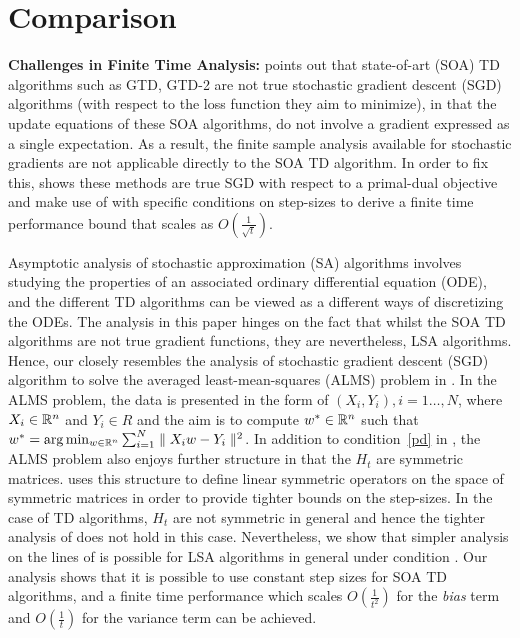 \section{Comparison}
\textbf{Challenges in Finite Time Analysis:} \cite{} points out that state-of-art (SOA) TD algorithms such as GTD, GTD-2 are not true stochastic gradient descent (SGD) algorithms (with respect to the loss function they aim to minimize), in that the update equations of these SOA algorithms, do not involve a gradient expressed as a single expectation. As a result, the finite sample analysis available for stochastic gradients are not applicable directly to the SOA TD algorithm. In order to fix this, \cite{} shows these methods are true SGD with respect to a primal-dual objective and make use of \cite{} with specific conditions on step-sizes to derive a finite time performance bound that scales as $O(\frac{1}{\sqrt{t}})$.\par
\begin{comment}
\textbf{Adaptive Step-sizes and Speed-up terms:} Efforts have been made to improve the performance of TD algorithms, by changing the step-sizes adaptively \cite{} or adding speed-up terms \cite{}. Whilst adaptive step-sizes can be guaranteed to improve, their effect on the finite time performance is not known. In the case of full state representation (tabular representation), the speedy Q-learning (SQL) algorithm adds a correction/speed-up term to achieve an $O(\frac{1}{\sqrt{t}})$ finite time performance. The analysis in this paper shows that the idea used by SQL cannot be extended effectively to the case when features are used.\par
\end{comment}
Asymptotic analysis of stochastic approximation (SA) algorithms involves studying the properties of an associated ordinary differential equation (ODE), and the different TD algorithms can be viewed as a different ways of discretizing the ODEs. The analysis in this paper hinges on the fact that whilst the SOA TD algorithms are not true gradient functions, they are nevertheless, LSA algorithms. Hence, our closely resembles the analysis of stochastic gradient descent (SGD) algorithm to solve the averaged least-mean-squares (ALMS) problem in \cite{bachalms}. In the ALMS problem, the data is presented in the form of $(X_i,Y_i),i=1\ldots,N$, where $X_i\in \mathbb{R}^n$ and $Y_i\in R$ and the aim is to compute $w^*\in \mathbb{R}^n$ such that $w^*=\arg\min_{w\in \mathbb{R}^n}\sum_{i=1}^N\parallel X_iw-Y_i\parallel^2$. In addition to condition~\ref{pd} in , the ALMS problem also enjoys further structure in that the $H_t$ are symmetric matrices. \cite{} uses this structure to define linear symmetric operators on the space of symmetric matrices in order to provide tighter bounds on the step-sizes. In the case of TD algorithms, $H_t$ are not symmetric in general and hence the tighter analysis of \cite{} does not hold in this case. Nevertheless, we show that simpler analysis on the lines of \cite{} is possible for LSA algorithms in general under condition . Our analysis shows that it is possible to use constant step sizes for SOA TD algorithms, and a finite time performance which scales $O(\frac{1}{t^2})$ for the \emph{bias} term and $O(\frac{1}{t})$ for the variance term can be achieved.
